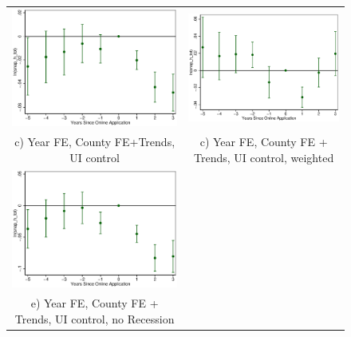 \documentclass[11pt,letterpaper]{article}
\begin{document}
\begin{figure}
\begin{tabular}{cc}
\includegraphics[scale=0.57]{tabfig/evstu_snap_h_tot_one_yrcfcttru_5_3}&\includegraphics[scale=0.57]{tabfig/evstu_snap_h_tot_total_pop_yrcfcttru_5_3}\\
c) Year FE, County FE+Trends, UI control& c) Year FE, County FE + Trends, UI control, weighted\\
\includegraphics[scale=0.57]{tabfig/evstu_snap_h_tot_one_yrcfcttrunor_5_3}\\
e) Year FE, County FE + Trends, UI control, no Recession\\
\end{tabular}
\end{figure}
\end{document}
